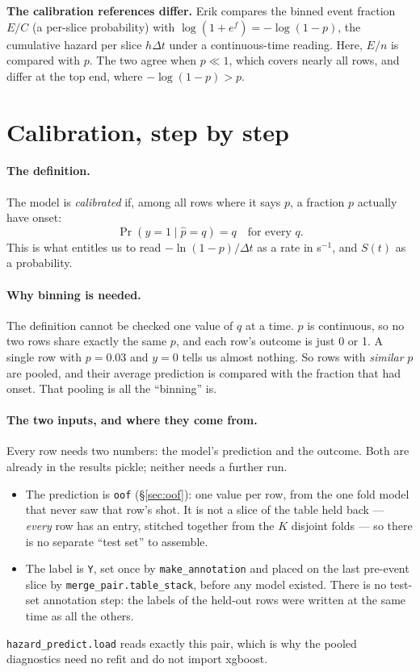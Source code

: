 \documentclass[11pt]{article}
\begin{document}
\textbf{The calibration references differ.} Erik compares the binned event
fraction $E/C$ (a per-slice probability) with $\log(1+e^{f})=-\log(1-p)$, the
cumulative hazard per slice $h\Delta t$ under a continuous-time reading. Here,
$E/n$ is compared with $p$. The two agree when $p\ll1$, which covers nearly all
rows, and differ at the top end, where $-\log(1-p)>p$.

\section{Calibration, step by step}\label{sec:cal}

\paragraph{The definition.}
The model is \emph{calibrated} if, among all rows where it says $p$, a fraction
$p$ actually have onset:
\[
\Pr(y=1 \mid \hat p = q) = q \quad\text{for every } q .
\]
This is what entitles us to read $-\ln(1-p)/\Delta t$ as a rate in s$^{-1}$, and $S(t)$
as a probability.

\paragraph{Why binning is needed.}
The definition cannot be checked one value of $q$ at a time. $p$ is continuous,
so no two rows share exactly the same $p$, and each row's outcome is just 0 or
1. A single row with $p=0.03$ and $y=0$ tells us almost nothing. So rows with
\emph{similar} $p$ are pooled, and their average prediction is compared with
the fraction that had onset. That pooling is all the ``binning'' is.

\paragraph{The two inputs, and where they come from.}
Every row needs two numbers: the model's prediction and the outcome. Both are
already in the results pickle; neither needs a further run.
\begin{itemize}
\item The prediction is \texttt{oof} (\S\ref{sec:oof}): one value per row, from
  the one fold model that never saw that row's shot. It is not a slice of the
  table held back --- \emph{every} row has an entry, stitched together from the
  $K$ disjoint folds --- so there is no separate ``test set'' to assemble.
\item The label is \texttt{Y}, set once by \texttt{make\_annotation} and placed
  on the last pre-event slice by \texttt{merge\_pair.table\_stack}, before any
  model existed. There is no test-set annotation step: the labels of the
  held-out rows were written at the same time as all the others.
\end{itemize}
\texttt{hazard\_predict.load} reads exactly this pair, which is why the pooled
diagnostics need no refit and do not import xgboost.
\end{document}
